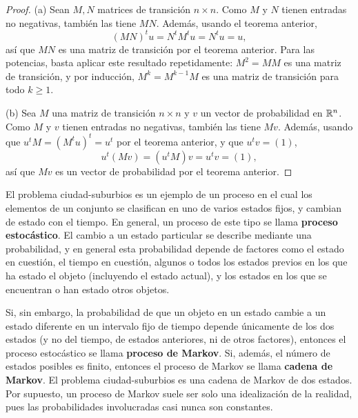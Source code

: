 \documentclass[12pt,a4paper]{book}
\begin{document}
    \begin{proof}
        (a) Sean $M,N$ matrices de transición $n\times n$. Como $M$ y $N$ tienen entradas no negativas, también las tiene $MN$. Además, usando el teorema anterior,
        \begin{equation*}
            (MN)^tu=N^tM^tu=N^tu=u,
        \end{equation*}
        así que $MN$ es una matriz de transición por el teorema anterior. Para las potencias, basta aplicar este resultado repetidamente: $M^2=MM$ es una matriz de transición, y por inducción, $M^{k}=M^{k-1}M$ es una matriz de transición para todo $k\geq 1$.

        (b) Sea $M$ una matriz de transición $n\times n$ y $v$ un vector de probabilidad en $\mathbb{R}^n$. Como $M$ y $v$ tienen entradas no negativas, también las tiene $Mv$. Además, usando que $u^tM=(M^tu)^t=u^t$ por el teorema anterior, y que $u^tv=(1)$,
        \begin{equation*}
            u^t(Mv)=(u^tM)v=u^tv=(1),
        \end{equation*}
        así que $Mv$ es un vector de probabilidad por el teorema anterior.
    \end{proof}

    El problema ciudad-suburbios es un ejemplo de un proceso en el cual los elementos de un conjunto se clasifican en uno de varios estados fijos, y cambian de estado con el tiempo. En general, un proceso de este tipo se llama \textbf{proceso estocástico}. El cambio a un estado particular se describe mediante una probabilidad, y en general esta probabilidad depende de factores como el estado en cuestión, el tiempo en cuestión, algunos o todos los estados previos en los que ha estado el objeto (incluyendo el estado actual), y los estados en los que se encuentran o han estado otros objetos.

    Si, sin embargo, la probabilidad de que un objeto en un estado cambie a un estado diferente en un intervalo fijo de tiempo depende únicamente de los dos estados (y no del tiempo, de estados anteriores, ni de otros factores), entonces el proceso estocástico se llama \textbf{proceso de Markov}. Si, además, el número de estados posibles es finito, entonces el proceso de Markov se llama \textbf{cadena de Markov}. El problema ciudad-suburbios es una cadena de Markov de dos estados. Por supuesto, un proceso de Markov suele ser solo una idealización de la realidad, pues las probabilidades involucradas casi nunca son constantes.
\end{document}
